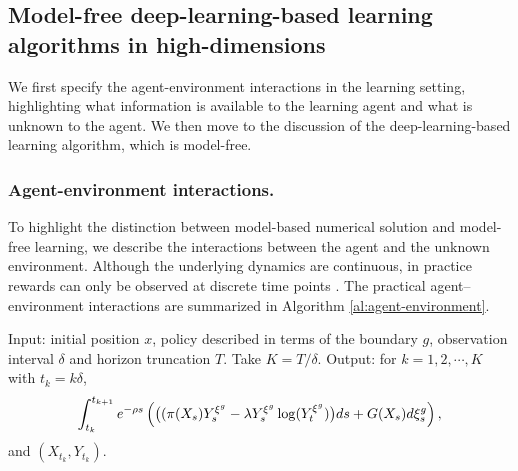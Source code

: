 \documentclass[11pt]{amsart}
\theoremstyle{plain}
\def \dd{{\rm d}}
\numberwithin{equation}{section}
\begin{document}
\subsection{Model-free deep-learning-based  learning algorithms in high-dimensions}
\label{sec:model-free}


We first specify the agent-environment interactions in the learning setting, highlighting what information is available to the learning agent and what is unknown to the agent. We then move to the discussion of the deep-learning-based learning algorithm, which is model-free.

 \subsubsection{Agent-environment interactions.}
 To highlight the distinction between model-based numerical solution and model-free learning, we describe the interactions between the agent and the unknown environment. Although the underlying dynamics are continuous, in practice rewards can only be observed at discrete time points \cite{jia2025accuracy}. The practical agent–environment interactions are summarized in Algorithm \ref{al:agent-environment}.



\begin{algorithm}[H]
\caption{Agent-Environment Interaction} \label{al:agent-environment}
\begin{algorithmic}[1]
\State Input: initial position $x$, policy described in terms of the boundary $g$, observation interval $\delta$ and horizon truncation $T$. Take $K=T/\delta$.
\State Output: for  $k=1,2,\cdots, K$ with $t_k=k\delta$,
\begin{eqnarray}
\int_{t_k}^{t_{k+1}}  e^{- \rho s} \left(\big( ( \pi (X_{s} )Y_{s}^{\xi^g}-\lambda Y_{s}^{\xi^g} \log  (Y_{t}^{\xi^g} ) \big) \dd s 
+   G(X_s) \dd\xi_s^g\right),  \label{eq:instantanuous_reward}
\end{eqnarray}
 and $(X_{t_k},Y_{t_k})$. 
\end{algorithmic}

\end{algorithm} 
\end{document}
